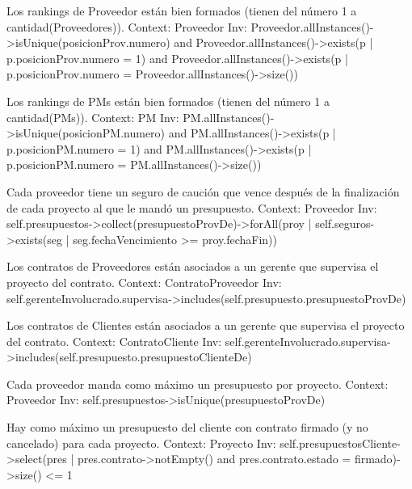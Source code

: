 \begin{listocl}

\begin{itemocl}{Los rankings de Proveedor están bien formados (tienen del número 1 a cantidad(Proveedores)).}
Context: Proveedor
Inv: Proveedor.allInstances()->isUnique(posicionProv.numero) and Proveedor.allInstances()->exists(p | p.posicionProv.numero = 1) and Proveedor.allInstances()->exists(p | p.posicionProv.numero = Proveedor.allInstances()->size())
\end{itemocl}

\begin{itemocl}{Los rankings de PMs están bien formados (tienen del número 1 a cantidad(PMs)).}
Context: PM
Inv: PM.allInstances()->isUnique(posicionPM.numero) and PM.allInstances()->exists(p | p.posicionPM.numero = 1) and PM.allInstances()->exists(p | p.posicionPM.numero = PM.allInstances()->size())
\end{itemocl}

\begin{itemocl}{Cada proveedor tiene un seguro de caución que vence después de la finalización de cada proyecto al que le mandó un presupuesto.}
Context: Proveedor
Inv: self.presupuestos->collect(presupuestoProvDe)->forAll(proy | self.seguros->exists(seg | seg.fechaVencimiento >= proy.fechaFin))
\end{itemocl}

\begin{itemocl}{Los contratos de Proveedores están asociados a un gerente que supervisa el proyecto del contrato.}
Context: ContratoProveedor
Inv: self.gerenteInvolucrado.supervisa->includes(self.presupuesto.presupuestoProvDe)
\end{itemocl}

\begin{itemocl}{Los contratos de Clientes están asociados a un gerente que supervisa el proyecto del contrato.}
Context: ContratoCliente
Inv: self.gerenteInvolucrado.supervisa->includes(self.presupuesto.presupuestoClienteDe)
\end{itemocl}

\begin{itemocl}{Cada proveedor manda como máximo un presupuesto por proyecto.}
Context: Proveedor
Inv: self.presupuestos->isUnique(presupuestoProvDe)
\end{itemocl}

\begin{itemocl}{Hay como máximo un presupuesto del cliente con contrato firmado (y no cancelado) para cada proyecto.}
Context: Proyecto
Inv: self.presupuestosCliente->select(pres | pres.contrato->notEmpty() and pres.contrato.estado = firmado)->size() <= 1
\end{itemocl}


\end{listocl}
